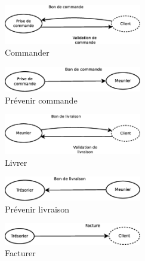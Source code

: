 \begin{figure}[!htb]
    \begin{center}
    \includegraphics[width=6cm]{images/cc1_mcc1.eps}
    \caption{\label{cc1_mcc1} Commander}
    \end{center}
\end{figure}

\begin{figure}[!htb]
    \begin{center}
    \includegraphics[width=6cm]{images/cc1_mcc2.eps}
    \caption{\label{cc1_mcc2} Prévenir commande}
    \end{center}
\end{figure}

\begin{figure}[!htb]
    \begin{center}
    \includegraphics[width=6cm]{images/cc1_mcc3.eps}
    \caption{\label{cc1_mcc3} Livrer}
    \end{center}
\end{figure}

\begin{figure}[!htb]
    \begin{center}
    \includegraphics[width=6cm]{images/cc1_mcc4.eps}
    \caption{\label{cc1_mcc4} Prévenir livraison}
    \end{center}
\end{figure}

\begin{figure}[!htb]
    \begin{center}
    \includegraphics[width=6cm]{images/cc1_mcc5.eps}
    \caption{\label{cc1_mcc4} Facturer}
    \end{center}
\end{figure}

